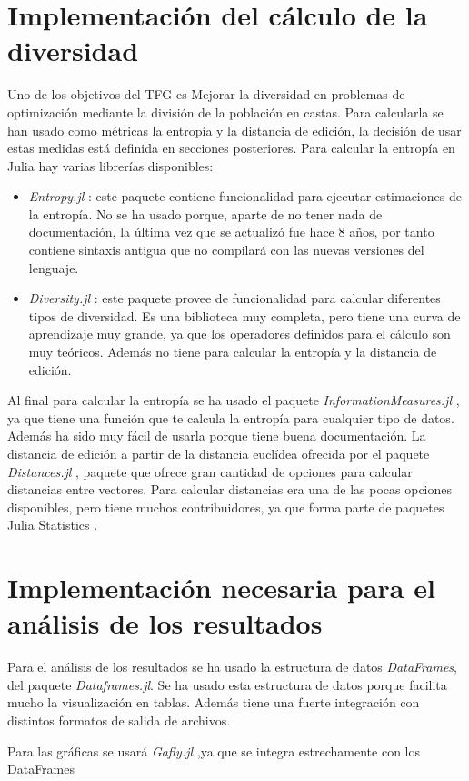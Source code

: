 \section{Implementación del cálculo de la diversidad}

Uno de los objetivos del TFG es Mejorar la diversidad en problemas de optimización mediante la división de la población en castas.
Para calcularla se han usado como métricas la entropía y la distancia de edición, la decisión de usar estas medidas
está definida en secciones posteriores. Para calcular la entropía en Julia hay varias librerías disponibles:

\begin{itemize}
    \item \emph{Entropy.jl} \cite{entropy_jl}: este paquete contiene funcionalidad para ejecutar estimaciones de la entropía. No se ha usado porque,
    aparte de no tener nada de documentación, la última vez que se actualizó fue hace 8 años, por tanto contiene
    sintaxis antigua que no compilará con las nuevas versiones del lenguaje.
    \item \emph{Diversity.jl} \cite{diversity_jl}: este paquete provee de funcionalidad para calcular diferentes
    tipos de diversidad. Es una biblioteca muy completa, pero tiene una curva de aprendizaje muy grande, ya que los
    operadores definidos para el cálculo son muy teóricos. Además no tiene para calcular la entropía y la distancia
    de edición.
\end{itemize}

Al final para calcular la entropía se ha usado el paquete \emph{InformationMeasures.jl} \cite{informationMeasures_jl}, ya 
que tiene una función que te calcula la entropía para cualquier tipo de datos. Además ha sido muy fácil de usarla porque 
tiene buena documentación. La distancia de edición a partir de la distancia euclídea ofrecida por el paquete
\emph{Distances.jl} \cite{distances_jl}, paquete que ofrece gran cantidad de opciones para calcular distancias entre vectores.
Para calcular distancias era una de las pocas opciones disponibles, pero tiene muchos contribuidores, ya que forma 
parte de paquetes Julia Statistics \cite{stats_jl}.

\section{Implementación necesaria para el análisis de los resultados}

Para el análisis de los resultados se ha usado la estructura de datos \emph{DataFrames}, del paquete \emph{Dataframes.jl}. Se
ha usado esta estructura de datos porque facilita mucho la visualización en tablas. Además tiene una fuerte
integración con distintos formatos de salida de archivos. 

Para las gráficas se usará \emph{Gafly.jl} \cite{gadfly_jl},ya que se integra estrechamente con los DataFrames